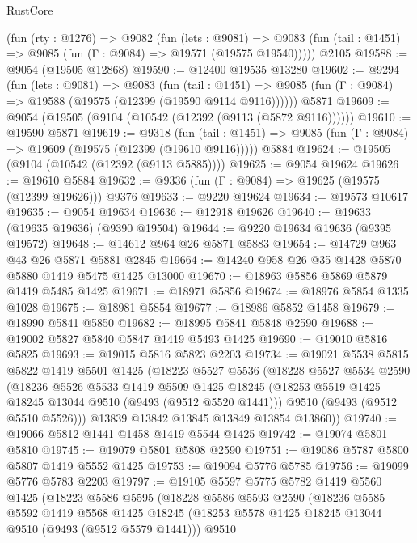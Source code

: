 \begin{lexlean}{RustCore}
\begin{coremodule}
    (fun (rty : @1276) =>
    @9082
      (fun (lets : @9081) =>
      @9083 (fun (tail : @1451) => @9085 (fun (Γ : @9084) => @19571 (@19575 @19540)))))
    @2105
@19588 := @9054 (@19505 @12868)
@19590 := @12400 @19535 @13280
@19602 := @9294
    (fun (lets : @9081) =>
    @9083
      (fun (tail : @1451) =>
      @9085 (fun (Γ : @9084) => @19588 (@19575 (@12399 (@19590 @9114 @9116))))))
    @5871
@19609 := @9054 (@19505 (@9104 (@10542 (@12392 (@9113 (@5872 @9116))))))
@19610 := @19590 @5871
@19619 := @9318
    (fun (tail : @1451) => @9085 (fun (Γ : @9084) => @19609 (@19575 (@12399 (@19610 @9116)))))
    @5884
@19624 := @19505 (@9104 (@10542 (@12392 (@9113 @5885))))
@19625 := @9054 @19624
@19626 := @19610 @5884
@19632 := @9336 (fun (Γ : @9084) => @19625 (@19575 (@12399 @19626))) @9376
@19633 := @9220 @19624
@19634 := @19573 @10617
@19635 := @9054 @19634
@19636 := @12918 @19626
@19640 := @19633 (@19635 @19636) (@9390 @19504)
@19644 := @9220 @19634 @19636 (@9395 @19572)
@19648 := @14612 @964 @26 @5871 @5883
@19654 := @14729 @963 @43 @26 @5871 @5881 @2845
@19664 := @14240 @958 @26 @35 @1428 @5870 @5880 @1419 @5475 @1425 @13000
@19670 := @18963 @5856 @5869 @5879 @1419 @5485 @1425
@19671 := @18971 @5856
@19674 := @18976 @5854 @1335 @1028
@19675 := @18981 @5854
@19677 := @18986 @5852 @1458
@19679 := @18990 @5841 @5850
@19682 := @18995 @5841 @5848 @2590
@19688 := @19002 @5827 @5840 @5847 @1419 @5493 @1425
@19690 := @19010 @5816 @5825
@19693 := @19015 @5816 @5823 @2203
@19734 := @19021
    @5538
    @5815
    @5822
    @1419
    @5501
    @1425
    (@18223
      @5527
      @5536
      (@18228
        @5527
        @5534
        @2590
        (@18236
          @5526
          @5533
          @1419
          @5509
          @1425
          @18245
          (@18253 @5519 @1425 @18245 @13044 @9510 (@9493 (@9512 @5520 @1441)))
          @9510
          (@9493 (@9512 @5510 @5526)))
        @13839
        @13842
        @13845
        @13849
        @13854
        @13860))
@19740 := @19066 @5812 @1441 @1458 @1419 @5544 @1425
@19742 := @19074 @5801 @5810
@19745 := @19079 @5801 @5808 @2590
@19751 := @19086 @5787 @5800 @5807 @1419 @5552 @1425
@19753 := @19094 @5776 @5785
@19756 := @19099 @5776 @5783 @2203
@19797 := @19105
    @5597
    @5775
    @5782
    @1419
    @5560
    @1425
    (@18223
      @5586
      @5595
      (@18228
        @5586
        @5593
        @2590
        (@18236
          @5585
          @5592
          @1419
          @5568
          @1425
          @18245
          (@18253 @5578 @1425 @18245 @13044 @9510 (@9493 (@9512 @5579 @1441)))
          @9510

\end{coremodule}
\end{lexlean}

